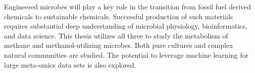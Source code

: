 Engineered microbes will play a key role in the transition from fossil fuel derived chemicals to sustainable chemicals.
Successful production of such materials requires substantial deep understanding of microbial physiology, bioinformatics, and data science.
This thesis utilizes all three to study the metabolism of methane and methanol-utilizing microbes.
Both pure cultures and complex natural communities are studied.
The potential to leverage machine learning for large meta-omics data sets is also explored.

